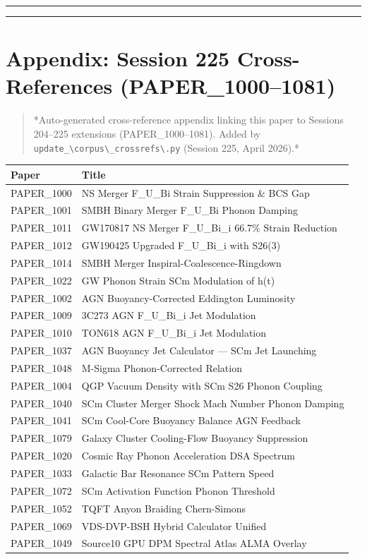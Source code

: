 \documentclass[12pt,a4paper]{article}
\begin{document}
\medskip\hrule\medskip

\medskip\hrule\medskip

\section{Appendix: Session 225 Cross-References (PAPER\_1000--1081)}

\begin{quote}
*Auto-generated cross-reference appendix linking this paper to
Sessions 204--225 extensions (PAPER\_1000--1081). Added by
\texttt{update\_\textbackslash {corpus\textbackslash \_crossrefs\textbackslash }.py} (Session 225, April 2026).*
\end{quote}

\begin{table}[H]
\centering
\small
\begin{tabularx}{\linewidth}{@{}>{\raggedright\arraybackslash}X>{\raggedright\arraybackslash}X@{}}
\toprule
Paper & Title \tabularnewline
\midrule
PAPER\_1000 & NS Merger F\_{U\_Bi} Strain Suppression \& BCS Gap \tabularnewline
PAPER\_1001 & SMBH Binary Merger F\_{U\_Bi} Phonon Damping \tabularnewline
PAPER\_1011 & GW170817 NS Merger F\_{U\_Bi\_i} 66.7\% Strain Reduction \tabularnewline
PAPER\_1012 & GW190425 Upgraded F\_{U\_Bi\_i} with S26(3) \tabularnewline
PAPER\_1014 & SMBH Merger Inspiral-Coalescence-Ringdown \tabularnewline
PAPER\_1022 & GW Phonon Strain SCm Modulation of h(t) \tabularnewline
PAPER\_1002 & AGN Buoyancy-Corrected Eddington Luminosity \tabularnewline
PAPER\_1009 & 3C273 AGN F\_{U\_Bi\_i} Jet Modulation \tabularnewline
PAPER\_1010 & TON618 AGN F\_{U\_Bi\_i} Jet Modulation \tabularnewline
PAPER\_1037 & AGN Buoyancy Jet Calculator --- SCm Jet Launching \tabularnewline
PAPER\_1048 & M-Sigma Phonon-Corrected Relation \tabularnewline
PAPER\_1004 & QGP Vacuum Density with SCm S26 Phonon Coupling \tabularnewline
PAPER\_1040 & SCm Cluster Merger Shock Mach Number Phonon Damping \tabularnewline
PAPER\_1041 & SCm Cool-Core Buoyancy Balance AGN Feedback \tabularnewline
PAPER\_1079 & Galaxy Cluster Cooling-Flow Buoyancy Suppression \tabularnewline
PAPER\_1020 & Cosmic Ray Phonon Acceleration DSA Spectrum \tabularnewline
PAPER\_1033 & Galactic Bar Resonance SCm Pattern Speed \tabularnewline
PAPER\_1072 & SCm Activation Function Phonon Threshold \tabularnewline
PAPER\_1052 & TQFT Anyon Braiding Chern-Simons \tabularnewline
PAPER\_1069 & VDS-DVP-BSH Hybrid Calculator Unified \tabularnewline
PAPER\_1049 & Source10 GPU DPM Spectral Atlas ALMA Overlay \tabularnewline
\bottomrule
\end{tabularx}
\end{table}
\end{document}
